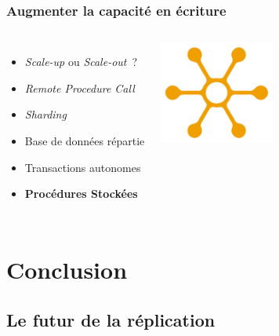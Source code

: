 \documentclass[english]{beamer}
\begin{document}
\begin{frame}[fragile]
  \frametitle{Augmenter la capacité en écriture}

  \linebreak
  \linebreak

\begin{columns}[c]

  \begin{itemize}
   \item<1-> \textit{Scale-up} ou \textit{Scale-out} ?
   \item<2-> \textit{Remote Procedure Call}
   \item<3-> \textit{Sharding}
   \item<3-> Base de données répartie
   \item<4-> Transactions autonomes
   \item<5-> \textbf{Procédures Stockées}
  \end{itemize}  

\includegraphics[height=9em]{distribution.jpg}
\end{columns}
\end{frame}



\section{Conclusion}

\subsection{Le futur de la réplication}
\end{document}
